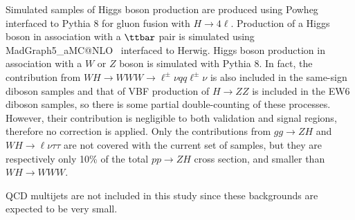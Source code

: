 Simulated samples of Higgs boson production are produced using {\sc Powheg} interfaced to {\sc Pythia} 8 for gluon fusion with $H\to 4\ell$. 
Production of a Higgs boson in association with a $\ttbar$ pair is simulated using {\sc MadGraph5\_aMC@NLO}~\cite{madgraph} interfaced to {\sc Herwig}. 
Higgs boson production in association with a $W$ or $Z$ boson is simulated with Pythia 8. 
In fact, the contribution from $WH\to WWW\to \ell^\pm\nu qq \ell^\pm\nu$ is also included in the same-sign diboson samples 
and that of VBF production of $H\to ZZ$ is included in the EW6 diboson samples, 
so there is some partial double-counting of these processes. 
However, their contribution is negligible to both validation and signal regions, therefore no correction is applied. 
Only the contributions from $gg\to ZH$ and $WH\to \ell\nu \tau\tau$ are not covered with the current set of samples, 
but they are respectively only 10\% of the total $pp\to ZH$ cross section, and smaller than $WH\to WWW$. 

QCD multijets are not included in this study since these backgrounds are expected to be very small.


